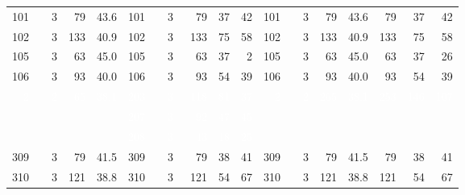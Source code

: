 \begin{table}[ht!]
\begin{tabular}{rrrrrrrrrrrrrrrr}
\bottomrule
101 & 3 & 79 & \multicolumn{1}{r|}{43.6} & 101 & 3 & 79 & 37 & \multicolumn{1}{r|}{42} & 101 & 3 & 79 & 43.6 & 79 & 37 & 42 \\
102  & 3 & 133 & \multicolumn{1}{r|}{40.9} & 102 & 3 & 133 & 75 & \multicolumn{1}{r|}{58} & 102 & 3 & 133 & 40.9 & 133 & 75 & 58 \\
105 & 3 & 63 & \multicolumn{1}{r|}{45.0} & 105 & 3 & 63 & 37 & \multicolumn{1}{r|}{2} & 105 & 3 & 63 & 45.0 & 63 & 37 & 26 \\ 
106 & 3 & 93 & \multicolumn{1}{r|}{40.0} & 106 & 3 & 93 & 54 & \multicolumn{1}{r|}{39} & 106 & 3 & 93 & 40.0 & 93 & 54 & 39 \\ 
\bottomrule
\colorbox{dark-gray}{\textcolor{white}{\ \  2}} & \colorbox{dark-gray}{\textcolor{white}{\ \  2}} & \colorbox{dark-gray}{\textcolor{white}{\  65}} & \multicolumn{1}{r|}{\colorbox{dark-gray}{\textcolor{white}{ 38.1}}} & \colorbox{dark-gray}{\textcolor{white}{ 203}} & \colorbox{dark-gray}{\textcolor{white}{\ \  3}} & \colorbox{dark-gray}{\textcolor{white}{\ 118}} & \colorbox{dark-gray}{\textcolor{white}{ 81}} & \multicolumn{1}{r|}{\colorbox{dark-gray}{\textcolor{white}{ 37}}} & \colorbox{dark-gray}{\textcolor{white}{\ \  2}} & \colorbox{dark-gray}{\textcolor{white}{\ \  2}} & \colorbox{dark-gray}{\textcolor{white}{ 265}} & \colorbox{dark-gray}{\textcolor{white}{ 38.1}} & \colorbox{dark-gray}{\textcolor{white}{ 253}} & \colorbox{dark-gray}{\textcolor{white}{ 146}} & \colorbox{dark-gray}{\textcolor{white}{ 107}} \\ 
 &  &  & \multicolumn{1}{r|}{﻿} & \colorbox{dark-gray}{\textcolor{white}{ 207}} & \colorbox{dark-gray}{\textcolor{white}{\ \  3}} & \colorbox{dark-gray}{\textcolor{white}{\ \  92}} & \colorbox{dark-gray}{\textcolor{white}{ 47}} & \multicolumn{1}{r|}{\colorbox{dark-gray}{\textcolor{white}{ ﻿45}}} &  &  &  &  &  &  &  \\ 
 &  &  & \multicolumn{1}{r|}{﻿} & \colorbox{dark-gray}{\textcolor{white}{ 208}} & \colorbox{dark-gray}{\textcolor{white}{\ \  3}} & \colorbox{dark-gray}{\textcolor{white}{\ \  43}} & \colorbox{dark-gray}{\textcolor{white}{ 18}} & \multicolumn{1}{r|}{\colorbox{dark-gray}{\textcolor{white}{ ﻿25}}} &  &  &  &  &  &  &  \\ 
\bottomrule
309 & 3 & 79 & \multicolumn{1}{r|}{﻿41.5} & 309 & 3 & 79 & 38 & \multicolumn{1}{r|}{﻿41} & 309 & 3 & 79 & 41.5 & 79 & 38 & 41 \\ 
310 & 3 & 121 & \multicolumn{1}{r|}{﻿38.8} & 310 & 3 & 121 & 54 & \multicolumn{1}{r|}{﻿67} & 310 & 3 & 121 & 38.8 & 121 & 54 & 67 \\ 

\end{tabular}
\end{table}
